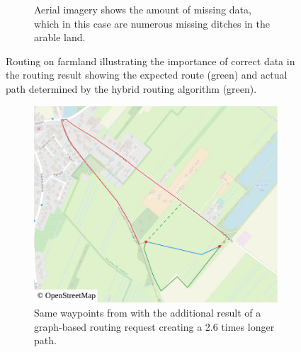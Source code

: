 \begin{figure}[h!]
\begin{minipage}[t]{.48\textwidth}
\begin{subfigure}[t]{\linewidth}
						\caption{Aerial imagery shows the amount of missing data, which in this case are numerous missing ditches in the arable land.}
						\label{fig:eval-rural-routing-6-aerial}
					\end{subfigure}
				\end{minipage}
				\caption{Routing on farmland illustrating the importance of correct data in the routing result showing the expected route (green) and actual path determined by the hybrid routing algorithm (green).}
				\label{fig:eval-rural-routing-6}
			\end{figure}
			
			\begin{figure}[h!]
				\begin{minipage}[t]{.48\textwidth}
					\begin{subfigure}[t]{\linewidth}
						\includegraphics[width=\textwidth]{images/qgis-routing-rural-routing-6-graph-based}
						\caption{Same waypoints from  with the additional result of a graph-based routing request creating a 2.6 times longer path.}
						\label{fig:eval-rural-graph-based-comparison-6}
					\end{subfigure}
				\end{minipage}
				\hfill
				\begin{minipage}[t]{.48\textwidth}
					\begin{subfigure}[t]{\linewidth}

\end{subfigure}
\end{minipage}
\end{figure}
